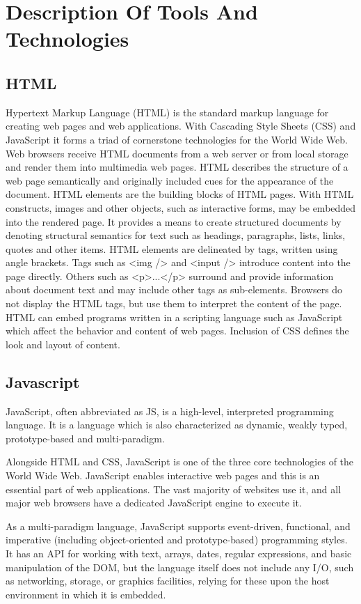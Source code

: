 \chapter{Description Of Tools And Technologies}

\section{HTML}
Hypertext Markup Language (HTML) is the standard markup language for creating web pages and web applications. With Cascading Style Sheets (CSS) and JavaScript it forms a triad of cornerstone technologies for the World Wide Web. Web browsers receive HTML documents from a web server or from local storage and render them into multimedia web pages. HTML describes the structure of a web page semantically and originally included cues for the appearance of the document.
HTML elements are the building blocks of HTML pages. With HTML constructs, images and other objects, such as interactive forms, may be embedded into the rendered page. It provides a means to create structured documents by denoting structural semantics for text such as headings, paragraphs, lists, links, quotes and other items. HTML elements are delineated by tags, written using angle brackets. Tags such as <img /> and <input /> introduce content into the page directly. Others such as <p>...</p> surround and provide information about document text and may include other tags as sub-elements. Browsers do not display the HTML tags, but use them to interpret the content of the page.
HTML can embed programs written in a scripting language such as JavaScript which affect the behavior and content of web pages. Inclusion of CSS defines the look and layout of content. 

\section{Javascript}
JavaScript, often abbreviated as JS, is a high-level, interpreted programming language. It is a language which is also characterized as dynamic, weakly typed, prototype-based and multi-paradigm.

Alongside HTML and CSS, JavaScript is one of the three core technologies of the World Wide Web. JavaScript enables interactive web pages and this is an essential part of web applications. The vast majority of websites use it, and all major web browsers have a dedicated JavaScript engine to execute it.

As a multi-paradigm language, JavaScript supports event-driven, functional, and imperative (including object-oriented and prototype-based) programming styles. It has an API for working with text, arrays, dates, regular expressions, and basic manipulation of the DOM, but the language itself does not include any I/O, such as networking, storage, or graphics facilities, relying for these upon the host environment in which it is embedded.

